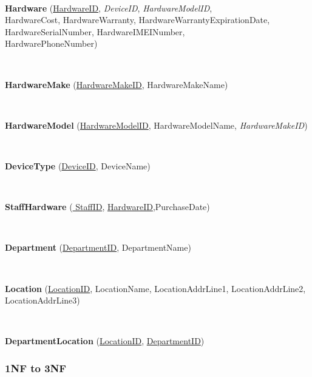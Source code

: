 \

\textbf{Hardware}  (\underline{HardwareID}, \textit{DeviceID},  \textit{HardwareModelID},\\ HardwareCost, HardwareWarranty, HardwareWarrantyExpirationDate,\\ HardwareSerialNumber, 		HardwareIMEINumber, \\HardwarePhoneNumber)

\

\textbf{HardwareMake} (\underline{HardwareMakeID}, HardwareMakeName)

\

\textbf{HardwareModel} (\underline{HardwareModelID}, HardwareModelName, \textit{HardwareMakeID})

\


\textbf{DeviceType}  (\underline{DeviceID}, DeviceName)


\


\textbf{StaffHardware}  (\underline{ StaffID}, \underline{ HardwareID},PurchaseDate)


\


\textbf{Department}  (\underline{DepartmentID}, DepartmentName)


\


\textbf{Location}  (\underline{LocationID}, LocationName, LocationAddrLine1, LocationAddrLine2, LocationAddrLine3)

\

\textbf{DepartmentLocation} (\underline{LocationID}, \underline{DepartmentID})




\subsubsection{1NF to 3NF}

